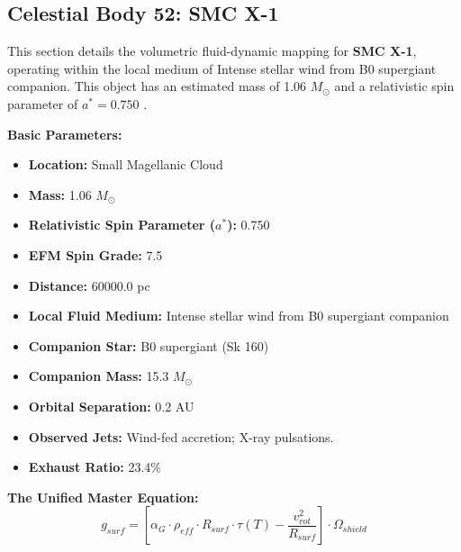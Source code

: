 \documentclass[11pt, a4paper]{article}
\begin{document}
\clearpage
\subsection{Celestial Body 52: SMC X-1}
This section details the volumetric fluid-dynamic mapping for \textbf{SMC X-1}, operating within the local medium of Intense stellar wind from B0 supergiant companion. This object has an estimated mass of 1.06 $M_{\odot}$ and a relativistic spin parameter of $a^* = 0.750$ \cite{vandermeer2007, simbad}.

\vspace{0.5em}
\noindent \textbf{Basic Parameters:}
\begin{itemize}
  \item \textbf{Location:} Small Magellanic Cloud
  \item \textbf{Mass:} 1.06 $M_{\odot}$
  \item \textbf{Relativistic Spin Parameter ($a^*$):} 0.750
  \item \textbf{EFM Spin Grade:} 7.5
  \item \textbf{Distance:} 60000.0 pc
  \item \textbf{Local Fluid Medium:} Intense stellar wind from B0 supergiant companion
  \item \textbf{Companion Star:} B0 supergiant (Sk 160)
  \item \textbf{Companion Mass:} 15.3 $M_{\odot}$
  \item \textbf{Orbital Separation:} 0.2 AU
  \item \textbf{Observed Jets:} Wind-fed accretion; X-ray pulsations.
  \item \textbf{Exhaust Ratio:} 23.4\%
\end{itemize}

\vspace{0.5em}
\noindent \textbf{The Unified Master Equation:}
$$ g_{surf} = \left[ \alpha_G \cdot \rho_{eff} \cdot R_{surf} \cdot \tau(T) - \frac{v_{rot}^2}{R_{surf}} \right] \cdot \Omega_{shield} $$
\end{document}
